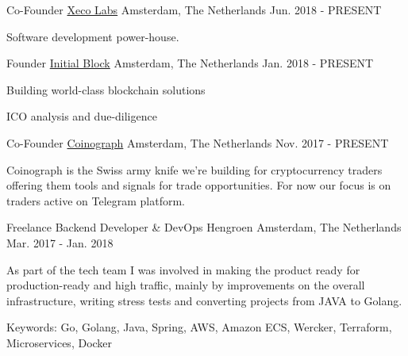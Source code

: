 

\begin{cventries}

  \cventry
    {Co-Founder} %
    {\href{https://www.xecolabs.com}{Xeco Labs}} %
    {Amsterdam, The Netherlands} %
    {Jun. 2018 - PRESENT} %
    {
    \begin{cvitems} %
      \item {Software development power-house.}
    \end{cvitems}
    }

  \cventry
    {Founder} %
    {\href{https://www.initialblock.com}{Initial Block}} %
    {Amsterdam, The Netherlands} %
    {Jan. 2018 - PRESENT} %
    {
    \begin{cvitems} %
      \item {Building world-class blockchain solutions}
      \item {ICO analysis and due-diligence}
    \end{cvitems}
    }

  \cventry
    {Co-Founder} %
    {\href{https://www.coinograph.io}{Coinograph}} %
    {Amsterdam, The Netherlands} %
    {Nov. 2017 - PRESENT} %
    {
      \begin{cvitems} %
        \item {Coinograph is the Swiss army knife we're building for cryptocurrency traders offering them tools and signals for trade opportunities. For now our focus is on traders active on Telegram platform.}
      \end{cvitems}
    }

  \cventry
    {Freelance Backend Developer \& DevOps} %
    {Hengroen} %
    {Amsterdam, The Netherlands} %
    {Mar. 2017 - Jan. 2018} %
    {
      \begin{cvitems} %
        \item {As part of the tech team I was involved in making the product ready for production-ready and high traffic, mainly by improvements on the overall infrastructure, writing stress tests and converting projects from JAVA to Golang.}
        \item {Keywords: Go, Golang, Java, Spring, AWS, Amazon ECS, Wercker, Terraform, Microservices, Docker}
      \end{cvitems}
    }


\end{cventries}
